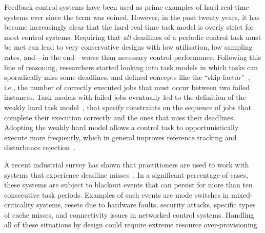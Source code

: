 Feedback control systems have been used as prime examples of hard real-time systems ever since the term was coined.
However, in the past twenty years, it has become increasingly clear that the hard real-time task model is overly strict for most control systems.
Requiring that \emph{all} deadlines of a periodic control task must be met can lead to very conservative designs with low utilisation, low sampling rates, and---in the end---worse than necessary control performance.
Following this line of reasoning, researchers started looking into task models in which tasks can sporadically miss some deadlines, and defined concepts like the ``skip factor''~\cite{Koren:1995}, i.e., the number of correctly executed jobs that must occur between two failed instances.
Task models with failed jobs eventually led to the definition of the weakly hard task model~\cite{Bernat:2001}, that specify constraints on the sequence of jobs that complete their execution correctly and the ones that miss their deadlines.
Adopting the weakly hard model allows a control task to opportunistically execute more frequently, which in general improves reference tracking and disturbance rejection~\cite{Chakraborty:2014a, Linsenmayer:2017, Pazzaglia:2018}.

A recent industrial survey has shown that practitioners are used to work with systems that experience deadline misses~\cite[Questions 14 and 15]{Akesson:2020}.
In a significant percentage of cases, these systems are subject to blackout events that can persist for more than ten consecutive task periods.
Examples of such events are mode switches in mixed-criticality systems, resets due to hardware faults, security attacks, specific types of cache misses, and connectivity issues in networked control systems.
Handling all of these situations by design could require extreme resource over-provisioning.

